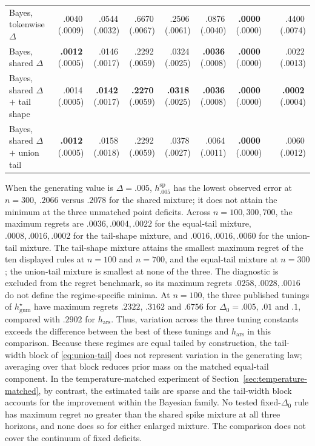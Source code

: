 \documentclass[11pt]{article}
\newcommand{\mcse}[2]{\mbox{#1\,{\fontsize{7}{8}\selectfont(#2)}}}
\newcommand{\bestmcse}[2]{\mbox{\textbf{#1}\,{\fontsize{7}{8}\selectfont(#2)}}}
\begin{document}
\begin{table}[p]
\begin{tabular}{@{}lrrrrrrcr@{}}
\addlinespace[1pt]
Bayes, tokenwise $\Delta$ & \mcse{.0040}{.0009} & \mcse{.0544}{.0032} & \mcse{.6670}{.0067} & \mcse{.2506}{.0061} & \mcse{.0876}{.0040} & \bestmcse{.0000}{.0000} & & \mcse{.4400}{.0074} \\
Bayes, shared $\Delta$ & \bestmcse{.0012}{.0005} & \mcse{.0146}{.0017} & \mcse{.2292}{.0059} & \mcse{.0324}{.0025} & \bestmcse{.0036}{.0008} & \bestmcse{.0000}{.0000} & & \mcse{.0022}{.0013} \\
Bayes, shared $\Delta$ $+$ tail shape & \mcse{.0014}{.0005} & \bestmcse{.0142}{.0017} & \bestmcse{.2270}{.0059} & \bestmcse{.0318}{.0025} & \bestmcse{.0036}{.0008} & \bestmcse{.0000}{.0000} & & \bestmcse{.0002}{.0004} \\
Bayes, shared $\Delta$ $+$ union tail & \bestmcse{.0012}{.0005} & \mcse{.0158}{.0018} & \mcse{.2292}{.0059} & \mcse{.0378}{.0027} & \mcse{.0064}{.0011} & \bestmcse{.0000}{.0000} & & \mcse{.0060}{.0012} \\
\bottomrule
\end{tabular}
\end{table}

When the generating value is $\Delta=.005$, $h^{\mathrm{sp}}_{.005}$ has the lowest observed error at $n=300$, $.2066$ versus $.2078$ for the shared mixture; it does not attain the minimum at the three unmatched point deficits.  Across $n=100,300,700$, the maximum regrets are $.0036,.0004,.0022$ for the equal-tail mixture, $.0008,.0016,.0002$ for the tail-shape mixture, and $.0016,.0016,.0060$ for the union-tail mixture.  The tail-shape mixture attains the smallest maximum regret of the ten displayed rules at $n=100$ and $n=700$, and the equal-tail mixture at $n=300$; the union-tail mixture is smallest at none of the three.  The diagnostic is excluded from the regret benchmark, so its maximum regrets $.0258,.0028,.0016$ do not define the regime-specific minima.  At $n=100$, the three published tunings of $h^\star_{\mathrm{gum}}$ have maximum regrets $.2322$, $.3162$ and $.6756$ for $\Delta_0=.005$, $.01$ and $.1$, compared with $.2902$ for $h_{\mathrm{ars}}$.  Thus, variation across the three tuning constants exceeds the difference between the best of these tunings and $h_{\mathrm{ars}}$ in this comparison.  Because these regimes are equal tailed by construction, the tail-width block of \eqref{eq:union-tail} does not represent variation in the generating law; averaging over that block reduces prior mass on the matched equal-tail component.  In the temperature-matched experiment of Section~\ref{sec:temperature-matched}, by contrast, the estimated tails are sparse and the tail-width block accounts for the improvement within the Bayesian family.  No tested fixed-$\Delta_0$ rule has maximum regret no greater than the shared spike mixture at all three horizons, and none does so for either enlarged mixture.  The comparison does not cover the continuum of fixed deficits.
\end{document}
